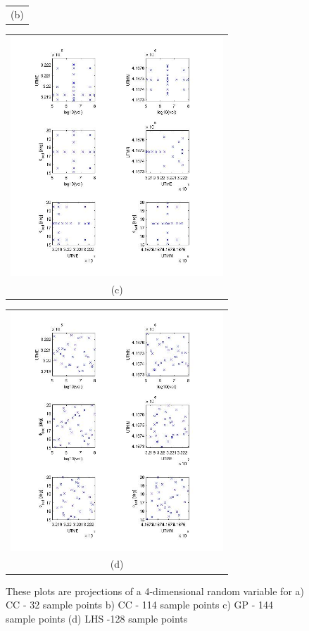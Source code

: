 \documentclass{article}
\newcommand{\Pic}[2][0.85]{\begin{center}\texttt{[image: \#2]}
 \end{center} }
\begin{document}
\begin{figure}[H]
\begin{minipage}[b]{0.6\textwidth}
\begin{tabular}{c}
        (b)
        \end{tabular}
    \end{minipage}
    \begin{minipage}{0.6\textwidth}
        \begin{tabular}{c}
	\includegraphics[width=8cm,height=9cm,keepaspectratio]{fig/picsdistrib/Gauss_Patterson.jpg}\\
        (c)
        \end{tabular}
    \end{minipage}
   \begin{minipage}[c]{0.6\textwidth}
       \begin{tabular}{c}
       \includegraphics[width=8cm,height=9cm,keepaspectratio]{fig/picsdistrib/lhs_32.jpg}\\
        (d)
        \end{tabular}
    \end{minipage}
\caption{ These plots are projections of a 4-dimensional random variable for a) CC - 32 sample points
b) CC - 114 sample points c) GP - 144 sample points (d) LHS -128 sample points }
\label{fig4}  
\end{figure}



	
%	
	
\end{document}
